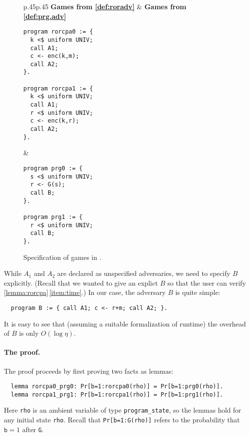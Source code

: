 \documentclass{article}
\begin{document}
\begin{figure}[t]\centering
  \lstset{aboveskip=0pt,belowskip=0pt,frame=single}
  \centering
  \begin{tabular}{p{.45\hsize}p{.45\hsize}}
    \textbf{Games from \autoref{def:roradv}}
    &
    \textbf{Games from \autoref{def:prg.adv}}
    \\[-5pt]
    \begin{lstlisting}
program rorcpa0 := {
  k <$ uniform UNIV;
  call A1;
  c <- enc(k,m);
  call A2;
}.

program rorcpa1 := {
  k <$ uniform UNIV;
  call A1;
  r <$ uniform UNIV;
  c <- enc(k,r);
  call A2;
}.
\end{lstlisting}
    &
      \begin{lstlisting}
program prg0 := {
  s <$ uniform UNIV;
  r <- G(s);
  call B;
}.

program prg1 := {
  r <$ uniform UNIV;
  call B;
}.
\end{lstlisting}
  \end{tabular}
  \vspace*{-5mm}
  \caption{Specification of games in .}
  \label{fig:rorprogs}
\end{figure}

While $A_1$
and $A_2$
are declared as unspecified adversaries, we need to specify $B$
explicitly. (Recall that we wanted to give an explict $B$
so that the user can verify
\autoref{lemma:rorcpa}\,\eqref{item:time}.) In our case, the adversary
$B$ is quite simple:
\begin{lstlisting}
  program B := { call A1; c <- r+m; call A2; }.
\end{lstlisting}
It is easy to see that (assuming a suitable formalization of runtime)
the overhead of $B$ is only $O(\log\eta)$.

\paragraph{The proof.} The proof proceeds by first proving two facts as lemmas:
\begin{lstlisting}
  lemma rorcpa0_prg0: Pr[b=1:rorcpa0(rho)] = Pr[b=1:prg0(rho)].
  lemma rorcpa1_prg1: Pr[b=1:rorcpa1(rho)] = Pr[b=1:prg1(rho)].
\end{lstlisting}
Here \texttt{rho} is an ambient variable of type
\texttt{program\_state}, so the lemmas hold for any initial state
\texttt{rho}. Recall that \texttt{Pr[b=1:G(rho)]} refers to the
probability that $\mathtt{b}=1$ after \texttt{G}.
\end{document}
